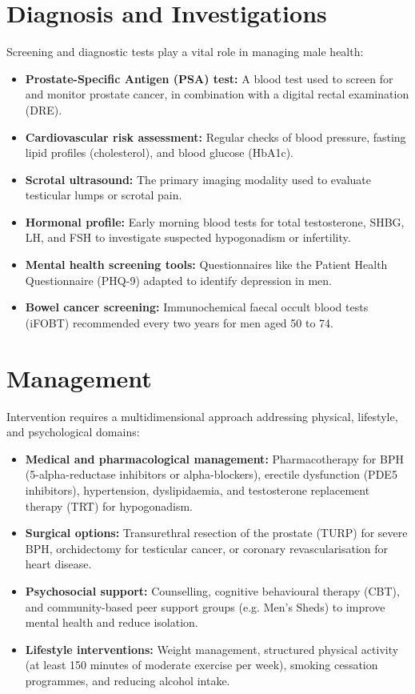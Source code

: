\section*{Diagnosis and Investigations}
Screening and diagnostic tests play a vital role in managing male health:
\begin{itemize}
    \item \textbf{Prostate-Specific Antigen (PSA) test:} A blood test used to screen for and monitor prostate cancer, in combination with a digital rectal examination (DRE).
    \item \textbf{Cardiovascular risk assessment:} Regular checks of blood pressure, fasting lipid profiles (cholesterol), and blood glucose (HbA1c).
    \item \textbf{Scrotal ultrasound:} The primary imaging modality used to evaluate testicular lumps or scrotal pain.
    \item \textbf{Hormonal profile:} Early morning blood tests for total testosterone, SHBG, LH, and FSH to investigate suspected hypogonadism or infertility.
    \item \textbf{Mental health screening tools:} Questionnaires like the Patient Health Questionnaire (PHQ-9) adapted to identify depression in men.
    \item \textbf{Bowel cancer screening:} Immunochemical faecal occult blood tests (iFOBT) recommended every two years for men aged 50 to 74.
\end{itemize}

\section*{Management}
Intervention requires a multidimensional approach addressing physical, lifestyle, and psychological domains:
\begin{itemize}
    \item \textbf{Medical and pharmacological management:} Pharmacotherapy for BPH (5-alpha-reductase inhibitors or alpha-blockers), erectile dysfunction (PDE5 inhibitors), hypertension, dyslipidaemia, and testosterone replacement therapy (TRT) for hypogonadism.
    \item \textbf{Surgical options:} Transurethral resection of the prostate (TURP) for severe BPH, orchidectomy for testicular cancer, or coronary revascularisation for heart disease.
    \item \textbf{Psychosocial support:} Counselling, cognitive behavioural therapy (CBT), and community-based peer support groups (e.g. Men's Sheds) to improve mental health and reduce isolation.
    \item \textbf{Lifestyle interventions:} Weight management, structured physical activity (at least 150 minutes of moderate exercise per week), smoking cessation programmes, and reducing alcohol intake.
\end{itemize}

